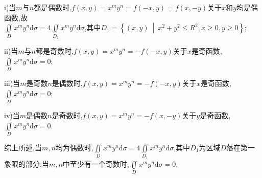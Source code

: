 \documentclass[12pt,UTF8]{ctexart}
\newcommand\Set[2]{\left\{#1\ \middle\vert\ #2 \right\}}
\newcommand{\aIInt}[1]{\iint\limits_{#1}}
\begin{document}
\begin{enumerate}
i)当$m$与$n$都是偶数时,$f(x,y)=x^my^n=f(-x,y)=f(x,-y)$关于$x$和$y$均是偶函数,故\\
$\aIInt{D}x^my^n\mathrm d\sigma=4\aIInt{D_1}x^my^n\mathrm d\sigma$,其中$D_1=\Set{(x,y)}{x^2+y^2\leqslant R^2,x\geqslant0,y\geqslant0}$;

ii)当$m$与$n$都是奇数时,$f(x,y)=x^my^n=-f(-x,y)$关于$x$是奇函数,$\aIInt{D}x^my^n\mathrm d\sigma=0$;

iii)当$m$是奇数$n$是偶数时,$f(x,y)=x^my^n=-f(-x,y)$关于$x$是奇函数,$\aIInt{D}x^my^n\mathrm d\sigma=0$;

iv)当$m$是偶数$n$是奇数时,$f(x,y)=x^my^n=-f(x,-y)$关于$y$是奇函数,$\aIInt{D}x^my^n\mathrm d\sigma=0$.

综上所述,当$m,n$均为偶数时,$\aIInt{D}x^my^n\mathrm d\sigma=4\aIInt{D_1}x^my^n\mathrm d\sigma$,其中$D_1$为区域$D$落在第一象限的部分;当$m,n$中至少有一个奇数时,$\aIInt{D}x^my^n\mathrm d\sigma=0$.
\end{enumerate}
\end{document}

